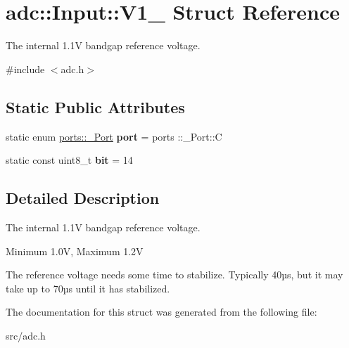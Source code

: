 \hypertarget{structadc_1_1Input_1_1V1__1}{}\section{adc\+:\+:Input\+:\+:V1\+\_ Struct Reference}
\label{structadc_1_1Input_1_1V1__1}


The internal 1.\+1V bandgap reference voltage.  




{\ttfamily \#include $<$adc.\+h$>$}

\subsection*{Static Public Attributes}
\begin{DoxyCompactItemize}
\item 
static enum \hyperlink{namespaceports_a9949317f344930bd6ad1097e80c97b67}{ports\+::\+\_\+\+Port} {\bfseries port} = ports \+::\+\_\+\+Port\+::C\hypertarget{structadc_1_1Input_1_1V1__1_a0f6e5910e843675ac0a56d2c5b4d9ef6}{}\label{structadc_1_1Input_1_1V1__1_a0f6e5910e843675ac0a56d2c5b4d9ef6}

\item 
static const uint8\+\_\+t {\bfseries bit} = 14\hypertarget{structadc_1_1Input_1_1V1__1_a810f3c569f78bd751aa399ace63d586d}{}\label{structadc_1_1Input_1_1V1__1_a810f3c569f78bd751aa399ace63d586d}

\end{DoxyCompactItemize}


\subsection{Detailed Description}
The internal 1.\+1V bandgap reference voltage. 

Minimum 1.\+0V, Maximum 1.\+2V

The reference voltage needs some time to stabilize. Typically 40µs, but it may take up to 70µs until it has stabilized. 

The documentation for this struct was generated from the following file\+:\begin{DoxyCompactItemize}
\item 
src/adc.\+h\end{DoxyCompactItemize}
